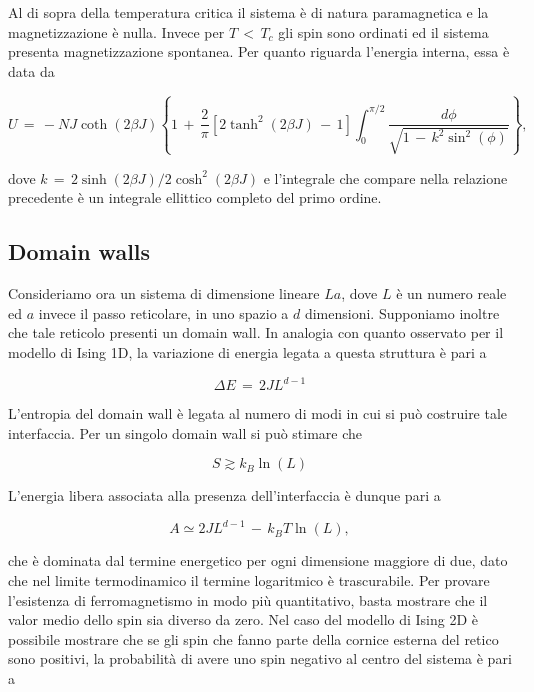 Al di sopra della temperatura critica il sistema è di natura paramagnetica e la magnetizzazione è nulla. Invece per $T\,<\,T_c$ gli 
spin sono ordinati ed il sistema presenta magnetizzazione spontanea. Per quanto riguarda l'energia interna, essa 
è data da

\begin{equation}
    U\,=\,-NJ\coth{\left(2\beta J\right)}\left\{1\,+\,\frac{2}{\pi}\left[2\tanh^2\left(2\beta J\right)\,-\,1\right]\int_0^{\pi/2}\frac{d\phi}{\sqrt{1\,-\,k^2\sin^2{\left(\phi\right)}}}\right\},
    \label{eq: ene_Onsager_1944}
\end{equation}

dove $k\,=\,2\sinh{\left(2\beta J\right)}/2\cosh^2{\left(2\beta J\right)}$ e l'integrale che compare nella relazione 
precedente è un integrale ellittico completo del primo ordine.



\subsection{Domain walls}

Consideriamo ora un sistema di dimensione lineare $La$, dove $L$ è un numero reale ed $a$ invece il passo reticolare, in uno spazio a $d$ dimensioni. 
Supponiamo inoltre che tale reticolo presenti un domain wall. In analogia con quanto osservato per il modello di Ising 1D, la 
variazione di energia legata a questa struttura è pari a 

\begin{equation}
    \Delta E\,=\,2JL^{d-1}
    \label{eq: ene_dw_IsingdD}
\end{equation}

L'entropia del domain wall è legata al numero di modi in cui si può costruire tale interfaccia. Per un singolo domain wall si può 
stimare che 

\begin{equation}
    S \gtrsim k_B \ln{\left(L\right)}
    \label{eq: entr_dw_IsingdD}
\end{equation}

L'energia libera associata alla presenza dell'interfaccia è dunque pari a 

\begin{equation}
    A \simeq 2JL^{d-1}\,-\,k_B T\ln{\left(L\right)},
    \label{eq: freeE_dw_IsingdD}
\end{equation}

che è dominata dal termine energetico per ogni dimensione maggiore di due, dato che nel limite termodinamico il termine 
logaritmico è trascurabile. Per provare l'esistenza di ferromagnetismo in modo più quantitativo, basta mostrare che il valor medio 
dello spin sia diverso da zero. Nel caso del modello di Ising 2D è possibile mostrare che se gli spin che fanno parte della cornice 
esterna del retico sono positivi, la probabilità di avere uno spin negativo al centro del sistema è pari a 

